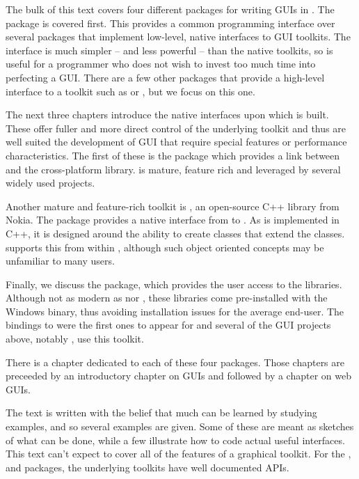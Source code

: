 The bulk of this text covers four different packages for writing GUIs
in \R. The  package is covered first. This provides a
common programming interface over several \R\/ packages that implement
low-level, native interfaces to GUI toolkits. The 
interface is much simpler -- and less powerful -- than the native
toolkits, so is useful for a programmer who does not wish to invest
too much time into perfecting a GUI. There are a few other packages
that provide a high-level \R\/ interface to a toolkit such as
 or , but we focus on this one.

The next three chapters introduce the native interfaces upon which
 is built. These offer fuller and more direct control of
the underlying toolkit and thus are well suited the development of GUI
that require special features or performance characteristics.  The
first of these is the  package which provides a link
between \R\/ and the cross-platform \GTK\/ library. \GTK\/ is mature,
feature rich and leveraged by several widely used
projects. 

Another mature and feature-rich toolkit is \Qt, an open-source C++ library
from Nokia. The \R\/ package  provides a native interface
from \R\/ to \Qt.  As \Qt\/ is implemented in C++, it is designed
around the ability to create classes that extend the \Qt\/
classes.  supports this from within \R\/, although such
object oriented concepts may be unfamiliar to many \R\/ users.

Finally, we discuss the  package, which provides the \R\/
user access to the \TK\/ libraries. Although not as modern as \GTK\/
nor \Qt, these libraries come pre-installed with the Windows binary,
thus avoiding installation issues for the average end-user. The
bindings to \TK\/ were the first ones to appear for \R\/ and 
several of the GUI projects above, notably , use this
toolkit.

There is a chapter dedicated to each of these four packages. Those
chapters are preceeded by an introductory chapter on GUIs and followed
by a chapter on web GUIs.

The text is written with the belief that much can be learned by
studying examples, and so several examples are given. Some of these
are meant as sketches of what can be done, while a few illustrate how
to code actual useful interfaces.  This text can't expect to cover all
of the features of a graphical toolkit. For the ,
 and  packages, the underlying toolkits have
well documented APIs.


